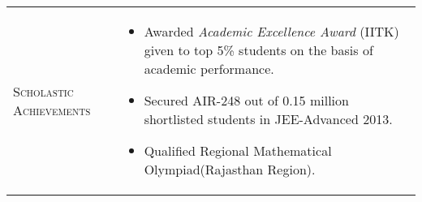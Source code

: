\documentclass[a4paper]{article}
\begin{document}
\vspace{-3em}
\centering
\begin{longtable}{@{}m{3.0cm}m{14cm}@{}}

  \textrm{\textsc {Scholastic Achievements}} & 
                                               \begin{itemize} \itemsep -2pt
                                               \item
                                                 Awarded \emph{Academic Excellence Award} (IITK) given to top 5\% students on the basis of academic performance.
                                               \item
                                                 Secured AIR-248 out of 0.15
                                                 million shortlisted  students in JEE-Advanced 2013.
                                               \item
                                                 Qualified Regional Mathematical Olympiad(Rajasthan Region).
                                               \end{itemize}

\\


\end{longtable}
\end{document}
